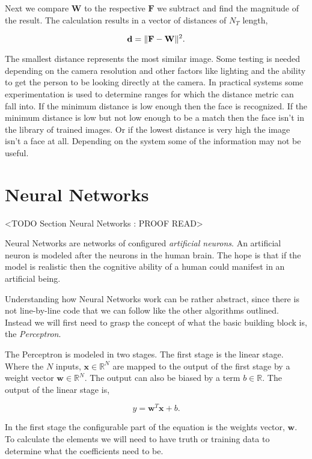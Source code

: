 Next we compare $\mathbf{W}$ to the respective $\mathbf{F}$ we subtract and find the magnitude of the result. The calculation results in a vector of distances of $N_T$ length,

\begin{equation}
\mathbf{d} = \| \mathbf{F}-\mathbf{W} \|^2.
\end{equation}	

The smallest distance represents the most similar image. Some testing is needed depending on the camera resolution and other factors like lighting and the ability to get the person to be looking directly at the camera. In practical systems some experimentation is used to determine ranges for which the distance metric can fall into. If the minimum distance is low enough then the face is recognized. If the minimum distance is low but not low enough to be a match then the face isn't in the library of trained images. Or if the lowest distance is very high the image isn't a face at all. Depending on the system some of the information may not be useful. 
	
\section{Neural Networks}
	<TODO Section Neural Networks : PROOF READ>

Neural Networks are networks of configured \emph{artificial neurons}. An artificial neuron is modeled after the neurons in the human brain. The hope is that if the model is realistic then the cognitive ability of a human could manifest in an artificial being. 

Understanding how Neural Networks work can be rather abstract, since there is not line-by-line code that we can follow like the other algorithms outlined. Instead we will first need to grasp the concept of what the basic building block is, the \emph{Perceptron}. 

The Perceptron is modeled in two stages. The first stage is the linear stage. Where the $N$ inputs, $\mathbf{x}\in \mathbb{R}^N$ are mapped to the output of the first stage by a weight vector $\mathbf{w}\in \mathbb{R}^{N}$. The output can also be biased by a term $b\in \mathbb{R}$. The output of the linear stage is,

\begin{equation}
y = \mathbf{w}^T\mathbf{x} + b.
\end{equation} 

In the first stage the configurable part of the equation is the weights vector, $\mathbf{w}$. To calculate the elements we will need to have truth or training data to determine what the coefficients need to be.

